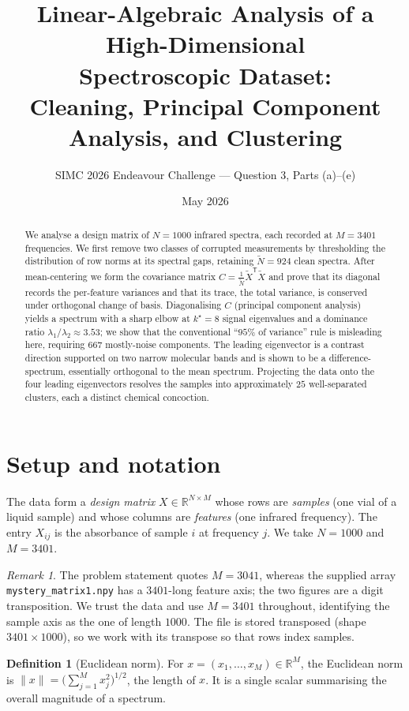 \documentclass[11pt]{article}
\title{\bfseries Linear-Algebraic Analysis of a High-Dimensional\\ Spectroscopic Dataset:\\ Cleaning, Principal Component Analysis, and Clustering}
\author{SIMC 2026 Endeavour Challenge --- Question 3, Parts (a)--(e)}
\date{May 2026}
\newcommand{\R}{\mathbb{R}}
\newcommand{\Xt}{\widetilde{X}}
\newcommand{\Nt}{\widetilde{N}}
\newcommand{\norm}[1]{\lVert #1 \rVert}
\newcommand{\T}{^{\mathsf{T}}}
\theoremstyle{definition}
\newtheorem{definition}{Definition}[section]
\theoremstyle{plain}
\theoremstyle{remark}
\newtheorem{remark}{Remark}[section]
\begin{document}
\maketitle

\begin{abstract}
\noindent
We analyse a design matrix of $N=1000$ infrared spectra, each recorded at $M=3401$
frequencies. We first remove two classes of corrupted measurements by thresholding the
distribution of row norms at its spectral gaps, retaining $\Nt=924$ clean spectra. After
mean-centering we form the covariance matrix $C=\tfrac1{\Nt}\Xt\T\Xt$ and prove that its
diagonal records the per-feature variances and that its trace, the total variance, is
conserved under orthogonal change of basis. Diagonalising $C$ (principal component
analysis) yields a spectrum with a sharp elbow at $k^\star=8$ signal eigenvalues and a
dominance ratio $\lambda_1/\lambda_2\approx3.53$; we show that the conventional
``$95\%$ of variance'' rule is misleading here, requiring $667$ mostly-noise components.
The leading eigenvector is a contrast direction supported on two narrow molecular bands and
is shown to be a difference-spectrum, essentially orthogonal to the mean spectrum.
Projecting the data onto the four leading eigenvectors resolves the samples into
approximately $25$ well-separated clusters, each a distinct chemical concoction.
\end{abstract}

\section{Setup and notation}\label{sec:setup}

The data form a \emph{design matrix} $X\in\R^{N\times M}$ whose rows are \emph{samples}
(one vial of a liquid sample) and whose columns are \emph{features} (one infrared
frequency). The entry $X_{ij}$ is the absorbance of sample $i$ at frequency $j$. We take
$N=1000$ and $M=3401$.

\begin{remark}
The problem statement quotes $M=3041$, whereas the supplied array
\texttt{mystery\_matrix1.npy} has a $3401$-long feature axis; the two figures are a digit
transposition. We trust the data and use $M=3401$ throughout, identifying the sample axis
as the one of length $1000$. The file is stored transposed (shape $3401\times1000$), so we
work with its transpose so that rows index samples.
\end{remark}

\begin{definition}[Euclidean norm]
For $x=(x_1,\dots,x_M)\in\R^M$, the Euclidean norm is
$\norm{x}=\bigl(\sum_{j=1}^M x_j^2\bigr)^{1/2}$, the length of $x$. It is a single scalar
summarising the overall magnitude of a spectrum.
\end{definition}
\end{document}
